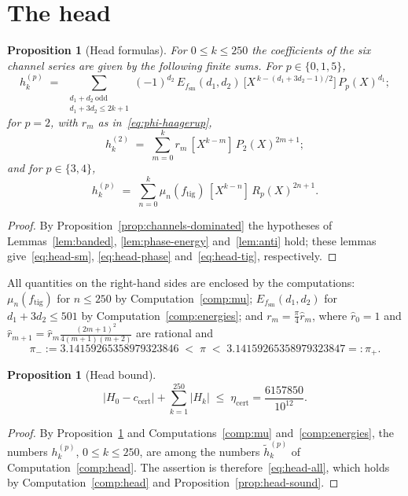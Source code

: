 \documentclass[11pt,reqno]{amsart}
\newtheorem{proposition}[theorem]{Proposition}
\theoremstyle{definition}
\numberwithin{equation}{section}
\newcommand{\ftig}{f_{\mathrm{tig}}}
\newcommand{\fsm}{f_{\mathrm{sm}}}
\newcommand{\ccert}{c_{\mathrm{cert}}}
\begin{document}
\section{The head}\label{sec:head}

\begin{proposition}[Head formulas]\label{prop:head-formulas}
For $0\le k\le250$ the coefficients of the six channel series are given by the following finite sums. For $p\in\{0,1,5\}$,
\begin{equation}\label{eq:head-sm}
  h^{(p)}_k\;=\;\sum_{\substack{d_1+d_2\ \mathrm{odd}\\ d_1+3d_2\le 2k+1}}(-1)^{d_2}\,E_{\fsm}(d_1,d_2)\ \bigl[X^{\,k-(d_1+3d_2-1)/2}\bigr]\,P_p(X)^{d_1};
\end{equation}
for $p=2$, with $r_m$ as in~\eqref{eq:phi-haagerup},
\begin{equation}\label{eq:head-phase}
  h^{(2)}_k\;=\;\sum_{m=0}^k r_m\, [X^{k-m}]\, P_2(X)^{2m+1};
\end{equation}
and for $p\in\{3,4\}$,
\begin{equation}\label{eq:head-tig}
  h^{(p)}_k\;=\;\sum_{n=0}^k \mu_n(\ftig)\, [X^{k-n}]\, R_p(X)^{2n+1}.
\end{equation}
\end{proposition}

\begin{proof}
By Proposition~\ref{prop:channels-dominated} the hypotheses of Lemmas~\ref{lem:banded}, \ref{lem:phase-energy} and~\ref{lem:anti} hold; these lemmas give~\eqref{eq:head-sm}, \eqref{eq:head-phase} and~\eqref{eq:head-tig}, respectively.
\end{proof}

All quantities on the right-hand sides are enclosed by the computations: $\mu_n(\ftig)$ for $n\le250$ by Computation~\ref{comp:mu}; $E_{\fsm}(d_1,d_2)$ for $d_1+3d_2\le501$ by Computation~\ref{comp:energies}; and $r_m=\frac\pi4\hat r_m$, where $\hat r_0=1$ and $\hat r_{m+1}=\hat r_m\frac{(2m+1)^2}{4(m+1)(m+2)}$ are rational and
\begin{equation}\label{eq:pi}
  \pi_-:=3.14159265358979323846\;<\;\pi\;<\;3.14159265358979323847=:\pi_+ .
\end{equation}

\begin{proposition}[Head bound]\label{prop:head}
\[
  |H_0-\ccert|+\sum_{k=1}^{250}|H_k|\;\le\;\eta_{\mathrm{cert}}=\frac{6157850}{10^{12}} .
\]
\end{proposition}

\begin{proof}
By Proposition~\ref{prop:head-formulas} and Computations~\ref{comp:mu} and~\ref{comp:energies}, the numbers $h^{(p)}_k$, $0\le k\le250$, are among the numbers $\tilde h^{(p)}_k$ of Computation~\ref{comp:head}. The assertion is therefore~\eqref{eq:head-all}, which holds by Computation~\ref{comp:head} and Proposition~\ref{prop:head-sound}.
\end{proof}
\end{document}
